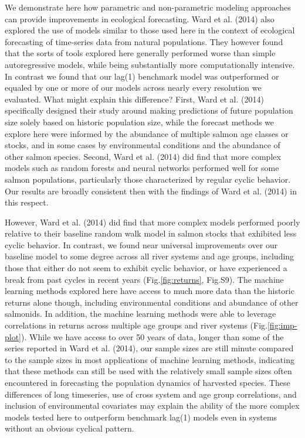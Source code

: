 \documentclass[
]{article}
\begin{document}
We demonstrate here how parametric and non-parametric modeling approaches can provide improvements in ecological forecasting. Ward et al. (2014) also explored the use of models similar to those used here in the context of ecological forecasting of time-series data from natural populations. They however found that the sorts of tools explored here generally performed worse than simple autoregressive models, while being substantially more computationally intensive. In contrast we found that our lag(1) benchmark model was outperformed or equaled by one or more of our models across nearly every resolution we evaluated. What might explain this difference? First, Ward et al. (2014) specifically designed their study around making predictions of future population size solely based on historic population size, while the forecast methods we explore here were informed by the abundance of multiple salmon age classes or stocks, and in some cases by environmental conditions and the abundance of other salmon species. Second, Ward et al. (2014) did find that more complex models such as random forests and neural networks performed well for some salmon populations, particularly those characterized by regular cyclic behavior. Our results are broadly consistent then with the findings of Ward et al. (2014) in this respect.

However, Ward et al. (2014) did find that more complex models performed poorly relative to their baseline random walk model in salmon stocks that exhibited less cyclic behavior. In contrast, we found near universal improvements over our baseline model to some degree across all river systems and age groups, including those that either do not seem to exhibit cyclic behavior, or have experienced a break from past cycles in recent years (Fig.\ref{fig:returns}, Fig.S9). The machine learning methods explored here have access to much more data than the historic returns alone though, including environmental conditions and abundance of other salmonids. In addition, the machine learning methods were able to leverage correlations in returns across multiple age groups and river systems (Fig.\ref{fig:imp-plot}). While we have access to over 50 years of data, longer than some of the series reported in Ward et al. (2014), our sample sizes are still minute compared to the sample sizes in most applications of machine learning methods, indicating that these methods can still be used with the relatively small sample sizes often encountered in forecasting the population dynamics of harvested species. These differences of long timeseries, use of cross system and age group correlations, and inclusion of environmental covariates may explain the ability of the more complex models tested here to outperform benchmark lag(1) models even in systems without an obvious cyclical pattern.
\end{document}
